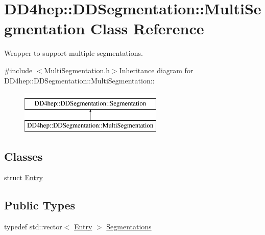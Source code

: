 \hypertarget{class_d_d4hep_1_1_d_d_segmentation_1_1_multi_segmentation}{
\section{DD4hep::DDSegmentation::MultiSegmentation Class Reference}
\label{class_d_d4hep_1_1_d_d_segmentation_1_1_multi_segmentation}
}


Wrapper to support multiple segmentations.  


{\ttfamily \#include $<$MultiSegmentation.h$>$}Inheritance diagram for DD4hep::DDSegmentation::MultiSegmentation::\begin{figure}[H]
\begin{center}
\leavevmode
\includegraphics[height=2cm]{class_d_d4hep_1_1_d_d_segmentation_1_1_multi_segmentation}
\end{center}
\end{figure}
\subsection*{Classes}
\begin{DoxyCompactItemize}
\item 
struct \hyperlink{struct_d_d4hep_1_1_d_d_segmentation_1_1_multi_segmentation_1_1_entry}{Entry}
\end{DoxyCompactItemize}
\subsection*{Public Types}
\begin{DoxyCompactItemize}
\item 
typedef std::vector$<$ \hyperlink{struct_d_d4hep_1_1_d_d_segmentation_1_1_multi_segmentation_1_1_entry}{Entry} $>$ \hyperlink{class_d_d4hep_1_1_d_d_segmentation_1_1_multi_segmentation_a083ba7cc081c5c3c47cafac5980100f8}{Segmentations}
\end{DoxyCompactItemize}
